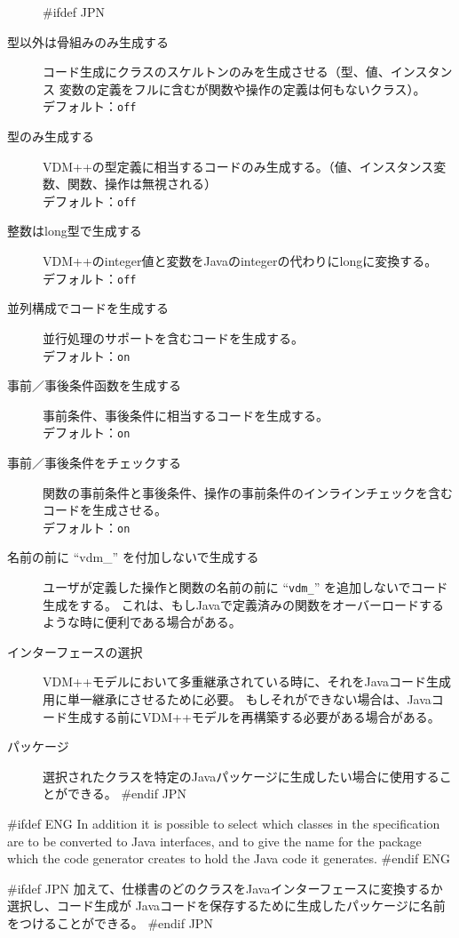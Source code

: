 \documentclass[\pformat,12pt]{article}
\begin{document}
\begin{description}
#ifdef JPN
\item[型以外は骨組みのみ生成する]
  コード生成にクラスのスケルトンのみを生成させる（型、値、インスタンス
  変数の定義をフルに含むが関数や操作の定義は何もないクラス）。 \\
  デフォルト：\texttt{off}
\item[型のみ生成する]
  VDM++の型定義に相当するコードのみ生成する。（値、インスタンス変数、関数、操作は無視される） \\
  デフォルト：\texttt{off}
\item[整数はlong型で生成する]
  VDM++のinteger値と変数をJavaのintegerの代わりにlongに変換する。 \\
  デフォルト：\texttt{off}
\item[並列構成でコードを生成する]
  並行処理のサポートを含むコードを生成する。 \\
  デフォルト：\texttt{on}
\item[事前／事後条件函数を生成する]
  事前条件、事後条件に相当するコードを生成する。 \\
  デフォルト：\texttt{on}
\item[事前／事後条件をチェックする]
  関数の事前条件と事後条件、操作の事前条件のインラインチェックを含むコードを生成させる。 \\
  デフォルト：\texttt{on}
\item[名前の前に ``vdm\_'' を付加しないで生成する]
  ユーザが定義した操作と関数の名前の前に ``\texttt{vdm\_}'' を追加しないでコード生成をする。
  これは、もしJavaで定義済みの関数をオーバーロードするような時に便利である場合がある。
\item[インターフェースの選択]
  VDM++モデルにおいて多重継承されている時に、それをJavaコード生成用に単一継承にさせるために必要。
  もしそれができない場合は、Javaコード生成する前にVDM++モデルを再構築する必要がある場合がある。
\item[パッケージ]
  選択されたクラスを特定のJavaパッケージに生成したい場合に使用することができる。
#endif JPN
\end{description}

#ifdef ENG
In addition it is possible to select which classes in the
specification are to be converted to Java interfaces, and to give the
name for the package which the code generator creates to hold the Java
code it generates.
#endif ENG

#ifdef JPN
加えて、仕様書のどのクラスをJavaインターフェースに変換するか選択し、コード生成が
Javaコードを保存するために生成したパッケージに名前をつけることができる。
#endif JPN
\end{document}
